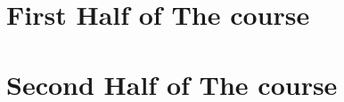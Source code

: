 \documentclass[10pt,oneside]{book}
\begin{document}
\maketitle
\tableofcontents
\listoffigures

\part{First Half of The course}


\part{Second Half of The course}

% 

\printindex
\end{document}

